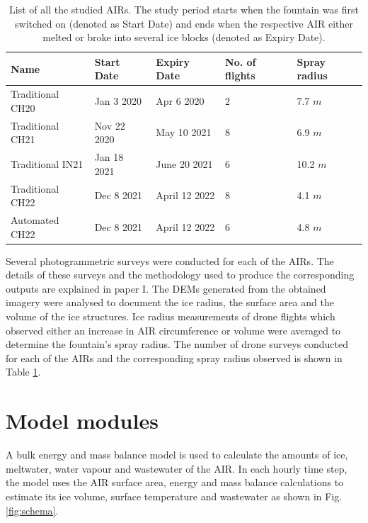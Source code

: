 \begin{table}
	\centering
	\caption{List of all the studied \ac{AIRs}. The study period starts when the fountain was first switched on
		(denoted as Start Date) and ends when the respective AIR either melted or broke into several ice blocks
		(denoted as Expiry Date). }
	\label{tab:AIRs}
	\begin{tabular}{|lllll|}
		\hline
		\textbf{Name}    & \textbf{Start Date} & \textbf{Expiry Date} & \textbf{No. of flights} & \textbf{Spray
		radius}                                                                                                 \\ \hline
		Traditional CH20 & Jan 3 2020          & Apr 6 2020           & 2                       & 7.7 $m$       \\
		Traditional CH21 & Nov 22 2020         & May 10 2021          & 8                       & 6.9 $m$       \\
		Traditional IN21 & Jan 18 2021         & June 20 2021         & 6                       & 10.2 $m$      \\
		Traditional CH22 & Dec 8 2021          & April 12 2022        & 8                       & 4.1 $m$       \\
		Automated CH22   & Dec 8 2021          & April 12 2022        & 6                       & 4.8 $m$       \\ \hline
	\end{tabular}
\end{table}


Several photogrammetric surveys were conducted for each of the \ac{AIRs}. The details of these surveys and the
methodology used to produce the corresponding outputs are explained in paper I. The
\ac{DEMs} generated from the obtained imagery were analysed to document the ice radius, the surface area and the
volume of the ice structures. Ice radius measurements of drone flights which observed either an increase in AIR
circumference or volume were averaged to determine the fountain's spray radius. The number of drone surveys
conducted for each of the AIRs and the corresponding spray radius observed is shown in Table \ref{tab:AIRs}.

\section{Model modules}
\label{sec:modules}

A bulk energy and mass balance model is used to calculate the amounts of ice, meltwater, water vapour and
wastewater of the AIR. In each hourly time step, the model uses the AIR surface area, energy and mass balance
calculations to estimate its ice volume, surface temperature and wastewater as shown in Fig. \ref{fig:schema}.

